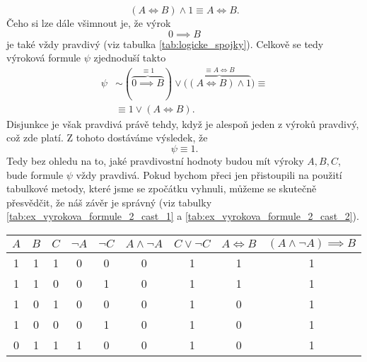 \begin{example}
\begin{solution}
        \begin{equation*}
            (A \iff B) \land 1 \equiv  A \iff B.
        \end{equation*}
        Čeho si lze dále všimnout je, že výrok
        \begin{equation*}
            0 \implies B
        \end{equation*}
        je také vždy pravdivý (viz tabulka \ref{tab:logicke_spojky}). Celkově se tedy výroková formule $\psi$ zjednoduší takto
        \begin{align*}
            \psi&\sim (\overbrace{0 \implies B}^{\equiv 1}) \lor \bigl(\overbrace{(A \iff B) \land 1}^{\equiv A \iff B}\bigr)\equiv  \\ &\equiv 1 \lor (A \iff B).
        \end{align*}
        Disjunkce je však pravdivá právě tehdy, když je alespoň jeden z výroků pravdivý, což zde platí. Z tohoto dostáváme výsledek, že
        \begin{equation*}
            \psi\equiv 1.
        \end{equation*}
        Tedy bez ohledu na to, jaké pravdivostní hodnoty budou mít výroky $A,B,C$, bude formule $\psi$ vždy pravdivá. Pokud bychom přeci jen přistoupili na použití tabulkové metody, které jsme se zpočátku vyhnuli, můžeme se skutečně přesvědčit, že náš závěr je správný (viz tabulky \ref{tab:ex_vyrokova_formule_2_cast_1} a \ref{tab:ex_vyrokova_formule_2_cast_2}).
        \begin{table}[h]
            \centering
            \begin{tabular}{|ccc|cccccc|}
            \hline
            $A$ & $B$ & $C$ & $\neg A$ & $\neg C$ & $A \land \neg A$ & $C \lor \neg C$ & $A \iff B$ & $(A \land \neg A) \implies B$ \\ \hline
            1   & 1   & 1   & 0        & 0        & 0                & 1                 & 1          & 1                             \\
            1   & 1   & 0   & 0        & 1        & 0                & 1                 & 1          & 1                             \\
            1   & 0   & 1   & 0        & 0        & 0                & 1                 & 0          & 1                             \\
            1   & 0   & 0   & 0        & 1        & 0                & 1                 & 0          & 1                             \\
            0   & 1   & 1   & 1        & 0        & 0                & 1                 & 0          & 1                             \\

\end{tabular}
\end{table}
\end{solution}
\end{example}
